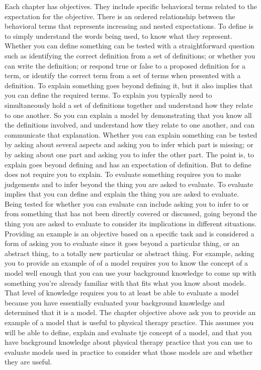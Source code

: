 Each chapter has objectives. They include specific behavioral terms related to the expectation for the objective. There is an ordered relationship between the behavioral terms that represents increasing and nested expectations.  To define is to simply understand the words being used, to know what they represent. Whether you can define something can be tested with a straightforward question such as identifying the correct definition from a set of definitions; or whether you can write the definition; or respond true or false to a proposed definition for a term, or identify the correct term from a set of terms when presented with a definition. To explain something goes beyond defining it, but it also implies that you can define the required terms. To explain you typically need to simultaneously hold a set of definitions together and understand how they relate to one another. So you can explain a model by demonstrating that you know all the definitions involved, and understand how they relate to one another, and can communicate that explanation. Whether you can explain something can be tested by asking about several aspects and asking you to infer which part is missing; or by asking about one part and asking you to infer the other part. The point is, to explain goes beyond defining and has an expectation of definition. But to define does not require you to explain. To evaluate something requires you to make judgements and to infer beyond the thing you are asked to evaluate. To evaluate implies that you can define and explain the thing you are asked to evaluate. Being tested for whether you can evaluate can include asking you to infer to or from something that has not been directly covered or discussed, going beyond the thing you are asked to evaluate to consider its implications in different situations. Providing an example is an objective based on a specific task and is considered a form of asking you to evaluate since it goes beyond a particular thing, or an abstract thing, to a totally new particular or abstract thing. For example, asking you to provide an example of of a model requires you to know the concept of a model well enough that you can use your background knowledge to come up with something you're already familiar with that fits what you know about models. That level of knowledge requires you to at least be able to evaluate a model because you have essentially evaluated your background knowledge and determined that it is a model. The chapter objective above ask you to provide an example of a model that is useful to physical therapy practice. This assumes you will be able to define, explain and evaluate tje concept of a model, and that you have background knowledge about physical therapy practice that you can use to evaluate models used in practice to consider what those models are and whether they are useful. 


